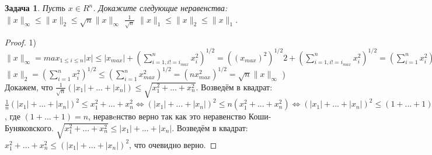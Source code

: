 \documentclass[a4paper]{article}
\newtheorem{problem}{Задача}
\begin{document}
\begin{problem} Пусть $x \in R^n$. Докажите следующие неравенства: $\|x\|_\infty \leq \|x\|_2 \leq \sqrt{n}\|x\|_\infty$ \newline
$\frac{1}{\sqrt{n}}$ $\|x\|_1 \leq \|x\|_2 \leq \|x\|_1$.
\end{problem}
\begin{proof}
1) $\|x\|_\infty = max_{1 \leq i \leq n} |x| \leq |x_{max}| + (\sum _{i=1, i != i_{max}}^n x_i^2)^{1/2} = ((x_{max})^2)^{1/2}2 + (\sum _{i=1, i != i_{max}}^n x_i^2)^{1/2} = (\sum _{i=1}^n x_i^2)^{1/2} = \|x\|_2$
\newline $\|x\|_2 = (\sum _{i=1}^n x_i^2)^{1/2} \leq (\sum _{i=1}^n x^2_{max})^{1/2} = (n x_{max}^2)^{1/2} = \sqrt{n}\|x\|_\infty$
) Докажем, что $\frac{1}{\sqrt{n}}(|x_1| + ... + |x_n|) \leq \sqrt{x_1^2 + ... + x_n^2}$. Возведём в квадрат: $\frac{1}{n}(|x_1| + ... + |x_n|)^2 \leq x_1^2 + ... + x_n^2 \Leftrightarrow (|x_1| + ... + |x_n|)^2 \leq n(x_1^2 + ... + x_n^2) \Leftrightarrow (|x_1| + ... + |x_n|)^2 \leq (1 + ... + 1)(x_1^2 + ... + x_n^2)$, где $(1 + ... + 1) = n$, неравeнство верно так как это неравенство Коши-Буняковского.
\newline $\sqrt{x_1^2 + ... + x_n^2} \leq |x_1| + ... + |x_n|$. Возведём в квадрат: $x_1^2 + ... + x_n^2 \leq (|x_1| + ... + |x_n|)^2$, что очевидно верно.
\end{proof}
\end{document}
